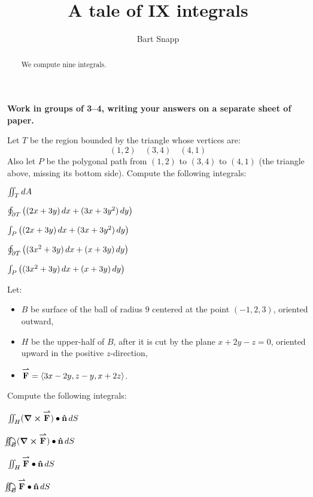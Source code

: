 \documentclass[nooutcomes,noauthor]{ximera}
\author{Bart Snapp}
\title[Collaborate:]{A tale of IX integrals}
\begin{document}
\begin{abstract}
  We compute nine integrals.
\end{abstract}
\maketitle

\textbf{Work in groups of 3--4, writing your answers on a separate
  sheet of paper.}

Let $T$ be the region bounded by the triangle whose vertices are:
\[
(1,2)\quad (3,4)\quad (4,1)
\]
Also let $P$ be the polygonal path from $(1,2)$ to $(3,4)$ to $(4,1)$
(the triangle above, missing its bottom side).  Compute the following
integrals:
\begin{problem}
  $\iint_T \mathop{}\!d A$
\end{problem}

\begin{problem}
  $\oint_{\partial T} \left((2x+3y)\mathop{}\!d x + (3x+3y^2)\mathop{}\!d y\right)$
\end{problem}

\begin{problem}
  $\int_P \left((2x+3y)\mathop{}\!d x + (3x+3y^2)\mathop{}\!d y\right)$
\end{problem}

\begin{problem}
  $\oint_{\partial T} \left((3x^2+3y)\mathop{}\!d x + (x+3y)\mathop{}\!d y\right)$
\end{problem}

\begin{problem}
  $\int_P \left((3x^2+3y)\mathop{}\!d x + (x+3y)\mathop{}\!d y\right)$
\end{problem}

\newpage

Let:\vfil
\begin{itemize}[noitemsep,topsep=0pt]
\item $B$ be surface of the ball of radius $9$ centered at the point
  $(-1,2,3)$, oriented outward,
\item $H$ be the upper-half of $B$, after it is cut by the plane
  $x+2y-z =0$, oriented upward in the positive $z$-direction,
\item ${\overset{\boldsymbol{\rightharpoonup}}{\mathbf{F}}} = \left\langle 3x-2y,z-y,x+2z\right\rangle$.
\end{itemize}
Compute the following integrals:
\begin{problem}
  $\iint_H (\boldsymbol\nabla\boldsymbol\times{\overset{\boldsymbol{\rightharpoonup}}{\mathbf{F}}})\bullet\mathbf{\hat{n}}\mathop{}\!d S$
\end{problem}

\begin{problem}
  ${\large\bigcirc}\kern-1.56em\iint_B (\boldsymbol\nabla\boldsymbol\times{\overset{\boldsymbol{\rightharpoonup}}{\mathbf{F}}})\bullet\mathbf{\hat{n}}\mathop{}\!d S$
\end{problem}

\begin{problem}
  $\iint_H {\overset{\boldsymbol{\rightharpoonup}}{\mathbf{F}}}\bullet\mathbf{\hat{n}}\mathop{}\!d S$
\end{problem}
\begin{problem}  
  ${\large\bigcirc}\kern-1.56em\iint_B {\overset{\boldsymbol{\rightharpoonup}}{\mathbf{F}}}\bullet\mathbf{\hat{n}}\mathop{}\!d S$
\end{problem}

\vfill
\end{document}
